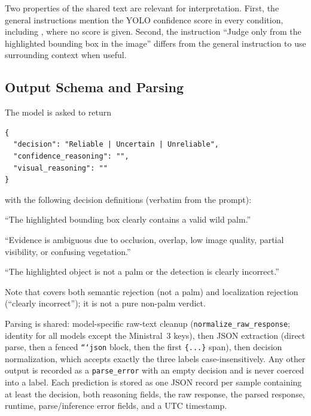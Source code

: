 Two properties of the shared text are relevant for interpretation. First, the
general instructions mention the YOLO confidence score in every condition,
including , where no score is given. Second, the  instruction
``Judge only from the highlighted bounding box in the image'' differs from the
general instruction to use surrounding context when useful.

\subsection{Output Schema and Parsing}
\label{sec:method:schema}
The model is asked to return
\begin{verbatim}
{
  "decision": "Reliable | Uncertain | Unreliable",
  "confidence_reasoning": "",
  "visual_reasoning": ""
}
\end{verbatim}
with the following decision definitions (verbatim from the prompt):
\begin{description}[leftmargin=1.5em]
  \item[\R{}] ``The highlighted bounding box clearly contains a valid wild palm.''
  \item[\U{}] ``Evidence is ambiguous due to occlusion, overlap, low image quality, partial visibility, or confusing vegetation.''
  \item[\Ur{}] ``The highlighted object is not a palm or the detection is clearly incorrect.''
\end{description}
Note that \Ur{} covers both semantic rejection (not a palm) and localization
rejection (``clearly incorrect''); it is not a pure non-palm verdict.

Parsing is shared: model-specific raw-text cleanup
(\texttt{normalize\_raw\_response}; identity for all models except the
Ministral~3 keys), then JSON extraction (direct parse, then a fenced
\texttt{```json} block, then the first \texttt{\{...\}} span), then decision
normalization, which accepts exactly the three labels case-insensitively. Any
other output is recorded as a \texttt{parse\_error} with an empty decision and is
never coerced into a label.
Each prediction is stored as one JSON record per sample containing at least the
decision, both reasoning fields, the raw response, the parsed response, runtime,
parse/inference error fields, and a UTC timestamp.

